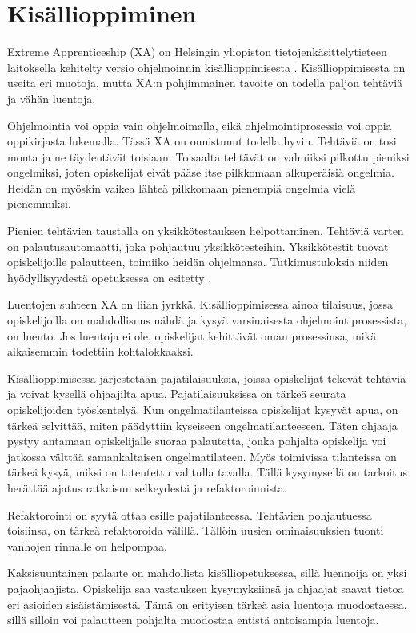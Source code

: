 \section{Kisällioppiminen}

Extreme Apprenticeship (XA) on Helsingin yliopiston tietojenkäsittelytieteen
laitoksella kehitelty versio ohjelmoinnin kisällioppimisesta
\cite{Vihavainen:2011:EAM:1953163.1953196}. Kisällioppimisesta on useita eri
muotoja, mutta XA:n pohjimmainen tavoite on todella paljon tehtäviä ja vähän
luentoja. %

Ohjelmointia voi oppia vain ohjelmoimalla, eikä ohjelmointiprosessia voi oppia
oppikirjasta lukemalla. Tässä XA on onnistunut todella hyvin. Tehtäviä on tosi
monta ja ne täydentävät toisiaan. Toisaalta tehtävät on valmiiksi pilkottu
pieniksi ongelmiksi, joten opiskelijat eivät pääse itse pilkkomaan alkuperäisiä
ongelmia. Heidän on myöskin vaikea lähteä pilkkomaan pienempiä ongelmia vielä
pienemmiksi. %

Pienien tehtävien taustalla on yksikkötestauksen helpottaminen. Tehtäviä varten
on palautusautomaatti, joka pohjautuu yksikkötesteihin. Yksikkötestit tuovat
opiskelijoille palautteen, toimiiko heidän ohjelmansa. Tutkimustuloksia niiden
hyödyllisyydestä opetuksessa on esitetty \cite{Bennedsen:2008}.

Luentojen suhteen XA on liian jyrkkä. Kisällioppimisessa ainoa tilaisuus, jossa
opiskelijoilla on mahdollisuus nähdä ja kysyä varsinaisesta
ohjelmointiprosessista, on luento. Jos luentoja ei ole, opiskelijat kehittävät
oman prosessinsa, mikä aikaisemmin todettiin kohtalokkaaksi.


Kisällioppimisessa järjestetään pajatilaisuuksia, joissa opiskelijat tekevät
tehtäviä ja voivat kysellä ohjaajilta apua. Pajatilaisuuksissa on tärkeä seurata
opiskelijoiden työskentelyä. Kun ongelmatilanteissa opiskelijat kysyvät apua, on
tärkeä selvittää, miten päädyttiin kyseiseen ongelmatilanteeseen. Täten ohjaaja
pystyy antamaan opiskelijalle suoraa palautetta, jonka pohjalta opiskelija voi
jatkossa välttää samankaltaisen ongelmatilateen. Myös toimivissa tilanteissa on
tärkeä kysyä, miksi on toteutettu valitulla tavalla. Tällä kysymysellä on
tarkoitus herättää ajatus ratkaisun selkeydestä ja refaktoroinnista.

Refaktorointi on syytä ottaa esille pajatilanteessa. Tehtävien pohjautuessa
toisiinsa, on tärkeä refaktoroida välillä. Tällöin uusien ominaisuuksien tuonti
vanhojen rinnalle on helpompaa.

Kaksisuuntainen palaute on mahdollista kisälliopetuksessa, sillä luennoija on
yksi pajaohjaajista. Opiskelija saa vastauksen kysymyksiinsä ja ohjaajat saavat
tietoa eri asioiden sisäistämisestä. Tämä on erityisen tärkeä asia luentoja
muodostaessa, sillä silloin voi palautteen pohjalta muodostaa entistä
antoisampia luentoja.
